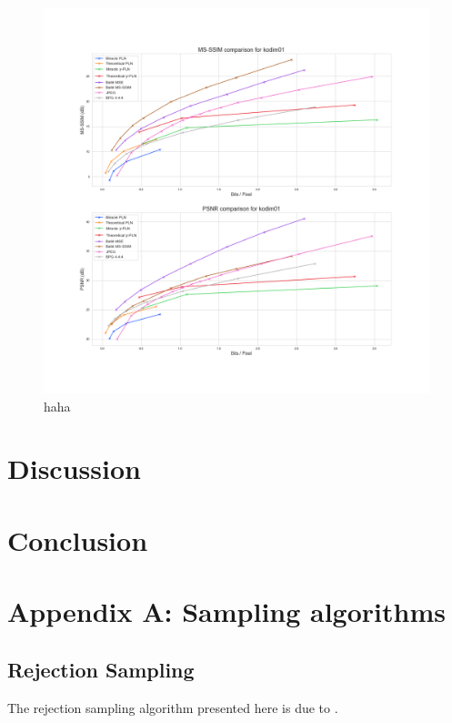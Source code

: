 \documentclass{article}
\begin{document}
\begin{figure}[H]
  \centering
  \includegraphics[width=\textwidth]{../img/plots/kodak_comparison/kodim01_comparison}
  \caption{haha}
  \label{fig:kodim01_comp}
\end{figure}


\section{Discussion}
\par
\section{Conclusion}
\par

\cite{townsend2019practical}
\printbibliography

\newpage

\section*{Appendix A: Sampling algorithms}
\subsection*{Rejection Sampling}
\par
The rejection sampling algorithm presented here is due to
\cite{harsha2007communication}.
\end{document}
